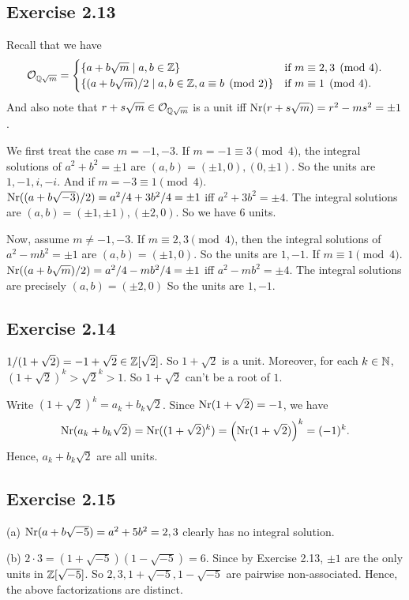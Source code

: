 \documentclass[../Marcus.tex]{subfiles}
\begin{document}
\subsection*{Exercise 2.13}

Recall that we have
$$
\mathcal{O}_{\mathbb{Q}\sqrt{m}}=
\begin{cases}
    \{ a+b\sqrt{m}\mid a,b\in\mathbb{Z} \} & \text{if } m \equiv 2,3 \pmod{4}. \\
    \{ (a+b\sqrt{m})/2 \mid a,b\in\mathbb{Z},a \equiv b \pmod{2} \} & \text{if } m \equiv 1 \pmod{4}.
\end{cases}
$$
And also note that $r+s\sqrt{m}\in \mathcal{O}_{\mathbb{Q}\sqrt{m}}$ is a unit iff $\operatorname{Nr}(r+s\sqrt{m})=r^2-ms^2=\pm1$.

We first treat the case $m=-1,-3$. If $m=-1 \equiv 3 \pmod{4}$, the integral solutions of $a^2+b^2=\pm1$ are $(a,b)=(\pm1,0),(0,\pm1)$. So the units are $1,-1,i,-i$. And if $m=-3 \equiv 1 \pmod{4}$. $\operatorname{Nr}((a+b\sqrt{-3})/2)=a^2/4+3b^2/4=\pm1$ iff $a^2+3b^2=\pm4$. The integral solutions are $(a,b)=(\pm1,\pm1),(\pm2,0)$. So we have 6 units.

Now, assume $m\neq-1,-3$. If $m \equiv 2,3 \pmod{4}$, then the integral solutions of $a^2-mb^2=\pm1$ are $(a,b)=(\pm1,0)$. So the units are $1,-1$. If $m \equiv 1 \pmod{4}$. $\operatorname{Nr}((a+b\sqrt{m})/2)=a^2/4-mb^2/4=\pm1$ iff $a^2-mb^2=\pm4$. The integral solutions are precisely $(a,b)=(\pm2,0)$ So the units are $1,-1$.

\subsection*{Exercise 2.14}

$1/(1+\sqrt{2})=-1+\sqrt{2}\in \mathbb{Z}[\sqrt{2}]$. So $1+\sqrt{2}$ is a unit. Moreover, for each $k\in\mathbb{N}$, $(1+\sqrt{2})^k>\sqrt{2}^k>1$. So $1+\sqrt{2}$ can't be a root of $1$.

Write $(1+\sqrt{2})^k=a_k+b_k\sqrt{2}$. Since $\operatorname{Nr}(1+\sqrt{2})=-1$, we have 
$$
\operatorname{Nr}(a_k+b_k\sqrt{2})=\operatorname{Nr}((1+\sqrt{2})^k)=\left(\operatorname{Nr}(1+\sqrt{2})\right)^k=(-1)^k.
$$
Hence, $a_k+b_k\sqrt{2}$ are all units.

\subsection*{Exercise 2.15}

(a) $\operatorname{Nr}(a+b\sqrt{-5}) = a^2+5b^2 = 2,3$ clearly has no integral solution.

(b) $2\cdot3=(1+\sqrt{-5})(1-\sqrt{-5})=6$. Since by Exercise 2.13, $\pm1$ are the only units in $\mathbb{Z}[\sqrt{-5}]$. So $2,3,1+\sqrt{-5},1-\sqrt{-5}$ are pairwise non-associated. Hence, the above factorizations are distinct.
\end{document}
